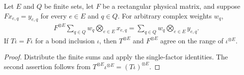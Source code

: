 \begin{lemma}%
    \label{lem:peps_physical_coherent_transport}
    \leanok
    Let $E$ and $Q$ be finite sets, let $F$ be a rectangular physical matrix,
    and suppose $Fx_{e,q}=y_{e,q}$ for every $e\in E$ and $q\in Q$.
    For arbitrary complex weights $w_q$,
    \begin{align}
        F^{\otimes E}\sum_{q\in Q}w_q\bigotimes_{e\in E}x_{e,q}
        =\sum_{q\in Q}w_q\bigotimes_{e\in E}y_{e,q}.
    \end{align}
    If $T\iota=F\iota$ for a bond inclusion $\iota$, then
    $T^{\otimes E}$ and $F^{\otimes E}$ agree on the range of
    $\iota^{\otimes E}$.
\end{lemma}
\begin{proof}\leanok
    Distribute the finite sums and apply the single-factor identities.
    The second assertion follows from
    $T^{\otimes E}\iota^{\otimes E}=(T\iota)^{\otimes E}$.
\end{proof}

